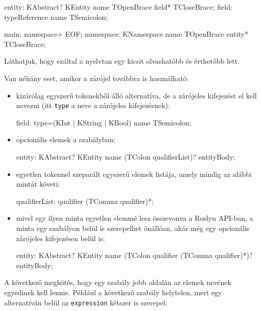 \documentclass[12pt, a4paper]{report}
\newcommand{\f}[1]{\texttt{#1}}
\begin{document}
\begin{antlr4code}
entity: KAbstract? KEntity name TOpenBrace field* TCloseBrace;
field: typeReference name TSemicolon;
\end{antlr4code}

\begin{antlr4code}
main: namespace+ EOF;
namespace: KNamespace name TOpenBrace entity* TCloseBrace;
\end{antlr4code}

Láthatjuk, hogy ezáltal a nyelvtan egy kicsit olvashatóbb és érthetőbb lett.

Van néhány eset, amikor a zárójel továbbra is használható:

\begin{itemize}
	\item kizárólag egyszerű tokenekből álló alternatíva, de a zárójeles kifejezést el kell nevezni (itt \f{type} a neve a zárójeles kifejezésnek):
	
\begin{antlr4code}
field: type=(KInt | KString | KBool) name TSemicolon;
\end{antlr4code}
	
	\item opcionális elemek a szabályban:
	
\begin{antlr4code}
entity: KAbstract? KEntity name (TColon qualifierList)? entityBody;
\end{antlr4code}
	
	\item egyetlen tokennel szeparált egyszerű elemek listája, amely mindig az alábbi mintát követi:
	
\begin{antlr4code}
qualifierList: qualifier (TComma qualifier)*;
\end{antlr4code}
	
	\item mivel egy ilyen minta egyetlen elemmé lesz összevonva a Roslyn API-ban, a minta egy szabályon belül is szerepelhet önállóan, akár még egy opcionális zárójeles kifejezésen belül is:
	
\begin{antlr4code}
entity: KAbstract? KEntity name (TColon qualifier (TComma qualifier)*)? entityBody;
\end{antlr4code}
\end{itemize}

A következő megkötés, hogy egy szabály jobb oldalán az elemek nevének egyedinek kell lennie. Például a következő szabály helytelen, mert egy alternatíván belül az \f{expression} kétszer is szerepel:
\end{document}
